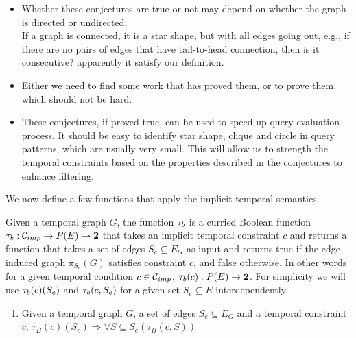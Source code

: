 \begin{itemize}
	\item Whether these conjectures are true or not may depend on whether
          the graph is directed or undirected.\\
          
          If a graph is connected, it is a star shape, but with all edges going
          out, e.g., if there are no pairs of edges that have tail-to-head
          connection, then is it consecutive? apparently it satisfy our definition.
        
	\item Either we need to find some work that has proved them, or to prove
          them, which should not be hard.
	\item These conjectures, if proved true, can be used to speed up query
          evaluation process. It should be easy to identify star shape, clique
          and circle in query patterns, which are usually very small. This will
          allow us to strength the temporal constraints based on the properties
          described in the conjectures to enhance filtering.
\end{itemize}

We now define a few functions that apply the implicit temporal semantics. 

\begin{defn}
  Given a temporal graph $G$, the function $\tau_b$ is a curried Boolean
  function $\tau_b : \mathcal{C}_{imp} \to P(E) \to \textbf{2} $ that takes an implicit
  temporal constraint $c$ and returns a function that takes a set of edges $S_e
  \subseteq E_G$ as input and returns true if the edge-induced graph
  $\pi_{S_e}(G)$ satisfies constraint $c$, and false otherwise. In other words
  for a given temporal condition $c \in \mathcal{C}_{imp}$, $\tau_b(c) : P(E) \to
  \textbf{2}$. For simplicity we will use $\tau_b(c)(S_e)$ and
  $\tau_b(c,S_e)$ for a given set $S_e \subseteq E$ interdependently.
\end{defn}

\begin{enumerate}
  \item Given a temporal graph $G$, a set of edges $S_e \subseteq E_G$ and
    a temporal constraint $c$, $\tau_B(c)(S_e) \Rightarrow \forall S
    \subseteq S_e (\tau_B(c, S))$
\end{enumerate}

